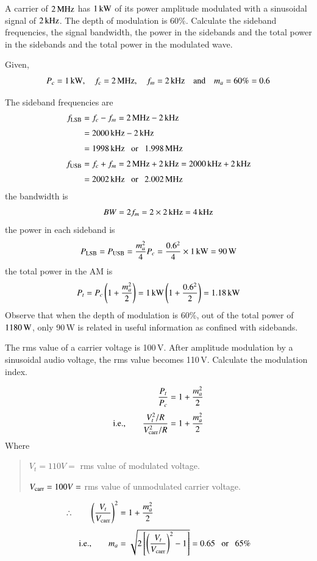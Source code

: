 \begin{example}\label{exam9.6}
A carrier of $2\text{\,MHz}$ has $1\text{\,kW}$ of its power amplitude modulated with a sinusoidal signal of $2\text{\,kHz}$. The depth of modulation is $60\%$. Calculate the sideband frequencies, the signal bandwidth, the power in the sidebands and the total power in the sidebands and the total power in the modulated wave.
\end{example}

\begin{solution}
Given,
$$
P_{c}=1\text{\,kW},\quad f_{c}=2\text{\,MHz},\quad f_{m}=2\text{\,kHz}\quad\text{and}\quad m_{a}=60\%=0.6
$$

The sideband frequencies are
\begin{align*}
f_{\text{LSB}} &= f_{c}-f_{m}=2\text{\,MHz}-2\text{\,kHz}\\[3pt]
&= 2000\text{\,kHz}-2\text{\,kHz}\\[3pt]
&= 1998\text{\,kHz}\text{~~ or~~ } 1.998\text{\,MHz}\\[3pt]
f_{\text{USB}} &= f_{c}+f_{m}=2\text{\,MHz}+2\text{\,kHz}=2000\text{\,kHz}+2\text{\,kHz}\\[3pt]
&= 2002\text{\,kHz}\text{~~ or~~ } 2.002\text{\,MHz}
\end{align*}
the bandwidth is
$$
BW=2f_{m}=2\times 2 \text{\,kHz}=4\text{\,kHz}
$$
the power in each sideband is
$$
P_{\text{LSB}}=P_{\text{USB}}=\dfrac{m^{2}_{a}}{4}P_{c}=\dfrac{0.6^{2}}{4}\times 1\text{\,kW}=90\text{\,W}
$$
the total power in the AM is
$$
P_{t}=P_{c}\left(1+\dfrac{m^{2}_{a}}{2}\right)=1\text{\,kW}\left(1+\frac{0.6^{2}}{2}\right)=1.18\text{\,kW}
$$
Observe that when the depth of modulation is 60\%, out of the total power of $1180\text{\,W}$, only 90\,W is related in useful information as confined with sidebands.
\end{solution}

\begin{example}\label{exam9.7}
The rms value of a carrier voltage is 100\,V. After amplitude modulation by a sinusoidal audio voltage, the rms value becomes 110\,V. Calculate the modulation index.
\end{example}

\begin{solution}
\begin{align*}
\dfrac{P_{t}}{P_{c}} &=1+\frac{m^{2}_{a}}{2}\\[3pt]
\text{i.e.,}\qquad \frac{V^{2}_{t}/R}{V^{2}_{\operatorname{carr}}/R} &= 1+\frac{m^{2}_{a}}{2}
\end{align*}
Where
\begin{quote}
$V_{t}=110V=$ rms value of modulated voltage.

$V_{\operatorname{carr}}=100V=$ rms value of unmodulated carrier voltage.
\end{quote}
\begin{align*}
\therefore\qquad \left(\dfrac{V_{t}}{V_{\operatorname{carr}}}\right)^{2} &= 1+\frac{m^{2}_{a}}{2}\\[3pt]
\text{i.e.,}\qquad m_{a} &= \sqrt{2\left[\left(\dfrac{V_{t}}{V_{\operatorname{carr}}}\right)^{2}-1\right]}=0.65\text{~~ or~~ } 65\%
\end{align*}
\end{solution}

